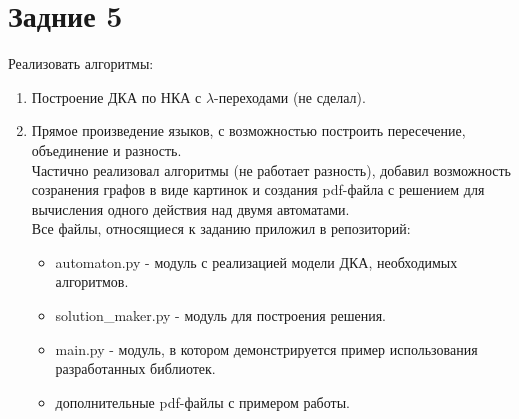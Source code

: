 \documentclass{article}
\begin{document}
    \section*{Задние 5}
    Реализовать алгоритмы:
    \begin{enumerate}
        \item Построение ДКА по НКА с \(\lambda\)-переходами (не сделал).
        \item Прямое произведение языков, с возможностью построить пересечение, объединение и разность.\\
        Частично реализовал алгоритмы (не работает разность), добавил возможность созранения графов в виде картинок и создания pdf-файла с решением для вычисления одного действия над двумя автоматами. \\Все файлы, относящиеся к заданию приложил в репозиторий:
        \begin{itemize}
            \item automaton.py - модуль с реализацией модели ДКА, необходимых алгоритмов.
            \item solution\_maker.py - модуль для построения решения.
            \item main.py - модуль, в котором демонстрируется пример использования разработанных библиотек.
            \item дополнительные pdf-файлы с примером работы.
        \end{itemize}

    \end{enumerate}
     
\end{document}
